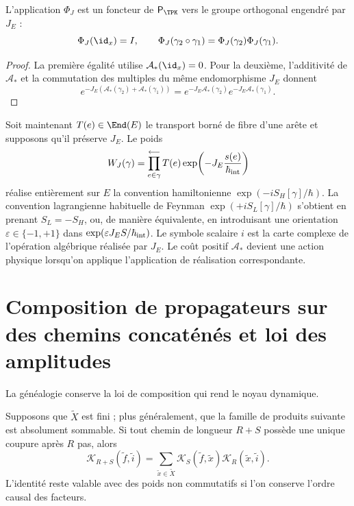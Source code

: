 \begin{proposition}
\label{prop:multiplicatividad-fase-interna}
L'application \(\Phi_J\) est un foncteur de \(\mathsf P_{\TPK}\) vers le groupe
orthogonal engendré par \(J_E\) :
\[
 \Phi_J(\id_x)=I,
 \qquad
 \Phi_J(\gamma_2\circ\gamma_1)
 =\Phi_J(\gamma_2)\Phi_J(\gamma_1).
\]
\end{proposition}

\begin{proof}
La première égalité utilise \(\mathcal A_*(\id_x)=0\). Pour la deuxième,
l'additivité de \(\mathcal A_*\) et la commutation des multiples du même
endomorphisme \(J_E\) donnent
\[
 e^{-J_E(\mathcal A_*(\gamma_2)+\mathcal A_*(\gamma_1))}
 =e^{-J_E\mathcal A_*(\gamma_2)}
  e^{-J_E\mathcal A_*(\gamma_1)}.
\]
\end{proof}

Soit maintenant \(T(e)\in\End(E)\) le transport borné de fibre d'une arête et
supposons
qu'il préserve \(J_E\). Le poids
\[
 W_J(\gamma)
 =\prod_{e\in\gamma}^{\longleftarrow}
   T(e)\exp\!\left(-J_E\frac{s(e)}{\hbar_{\rm int}}\right)
\]
réalise entièrement sur \(E\) la convention hamiltonienne
\(\exp(-iS_H[\gamma]/\hbar)\). La convention lagrangienne habituelle de Feynman
\(\exp(+iS_L[\gamma]/\hbar)\) s'obtient en prenant \(S_L=-S_H\), ou,
de manière équivalente, en introduisant une orientation
\(\varepsilon\in\{-1,+1\}\) dans
\(\exp(\varepsilon J_ES/\hbar_{\rm int})\). Le symbole scalaire \(i\) est la
carte complexe de l'opération algébrique réalisée par \(J_E\). Le coût
positif \(\mathcal A_*\) devient une action physique lorsqu'on applique l'application de
réalisation correspondante.

\section{Composition de propagateurs sur des chemins concaténés et loi des amplitudes}

La généalogie conserve la loi de composition qui rend le noyau dynamique.

\begin{proposition}
\label{prop:chapman-kolmogorov-genealogico}
Supposons que \(\widetilde X\) est fini ; plus généralement, que la famille de
produits suivante est absolument sommable. Si tout chemin de longueur
\(R+S\) possède une unique coupure après \(R\) pas, alors
\begin{equation}
 \mathcal K_{R+S}(\widetilde f,\widetilde i)
 =\sum_{\widetilde x\in\widetilde X}
   \mathcal K_S(\widetilde f,\widetilde x)
   \mathcal K_R(\widetilde x,\widetilde i).
 \label{eq:convolucion-kernel}
\end{equation}
L'identité reste valable avec des poids non commutatifs si l'on conserve
l'ordre causal des facteurs.
\end{proposition}

